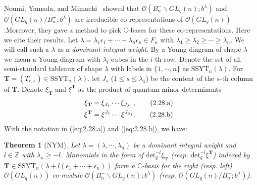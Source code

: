 \documentclass[table,a4paper,reqno]{amsart}
\numberwithin{equation}{section}
\newtheorem{theorem}{Theorem}[section]
\theoremstyle{definition}
\begin{document}
Noumi, Yamada, and Mimachi~\cite{noumi1993finite} showed that $\mathcal{O}(B_n^-\backslash GL_q(n);b^\lambda)$ and\\ $\mathcal{O}( GL_q(n)/B_n^+;b^\lambda)$ are irreducible co-representations of $ \mathcal{O}(GL_q(n))$.Moreover, they gave a method to pick $\mathbb{C}$-bases for these co-representations. Here we cite their results. Let $\lambda=\lambda_1\epsilon_1+\cdots+\lambda_n\epsilon_n\in F_n$ with $\lambda_1\ge\lambda_2\ge\cdots\ge\lambda_n$. We will call such a $\lambda$ as a \textit{dominant integral weight}. By a Young diagram of shape $\lambda$ we mean a Young diagram with $\lambda_i$ cubes in the $i$-th row. Denote the set of all semi-standard tableaux of shape $\lambda$ with labels in $\{1,\cdots,n\}$ as $\text{SSYT}_n(\lambda)$. For $\mathbf{T}=(T_{r,s})\in \text{SSYT}_n(\lambda)$, let $J_s$ ($1\le s\le \lambda_1$) be the content of the $s$-th column of $\mathbf{T}$. Denote $\xi_{\mathbf{T}}$ and $\xi^{\mathbf{T}}$ as the product of quantum minor determinants
\begin{align}\stepcounter{equation}
    \xi_{\mathbf{T}}&=\xi_{J_1}\cdots\xi_{J_{\lambda_1}},\tag{2.28.a}\label{eq:2.29.a}\\
    \xi^{\mathbf{T}}&=\xi^{J_1}\cdots\xi^{J_{\lambda_1}}.\tag{2.28.b}\label{eq:2.29.b}
\end{align}
With the notation in (\ref{eq:2.28.a}) and (\ref{eq:2.28.b}), we have:
\begin{theorem}[NYM]\label{thm:2.1}
    Let $\lambda=(\lambda,\cdots,\lambda_n)$ be a dominant integral weight and $l\in\mathbb{Z}$ with $\lambda_n\ge -l$. Monomials in the form of $\text{det}_q^{-l}\xi_{\mathbf{T}}$ (resp. $\text{det}_q^{-l}\xi^{\mathbf{T}}$) indexed by $\mathbf{T}\in \text{SSYT}_n(\lambda+l(\epsilon_1+\cdots+\epsilon_n))$ form a $\mathbb{C}$-basis for the right (resp. left) $\mathcal{O}(GL_q(n))$ co-module $\mathcal{O}(B_n^-\backslash GL_q(n);b^\lambda)$ (resp. $\mathcal{O}( GL_q(n)/B_n^+;b^\lambda)$).
\end{theorem}
\end{document}
